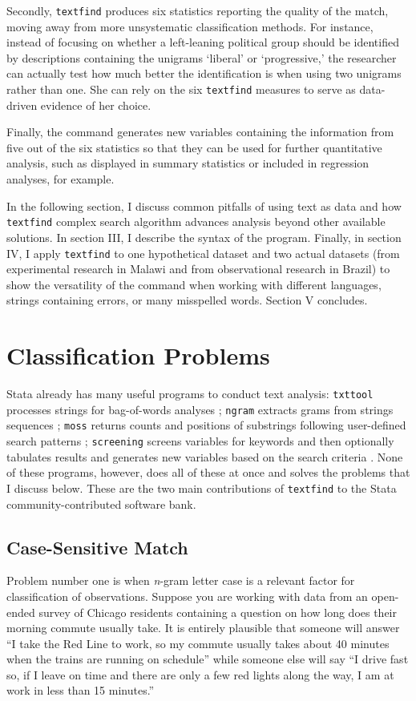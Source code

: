 Secondly, {\tt textfind} produces six statistics reporting the quality of the match, moving away from more unsystematic classification methods. For instance, instead of focusing on whether a left-leaning political group should be identified by descriptions containing the unigrams `liberal' or `progressive,' the researcher can actually test how much better the identification is when using two unigrams rather than one. She can rely on the six {\tt textfind} measures to serve as data-driven evidence of her choice.

Finally, the command generates new variables containing the information from five out of the six statistics so that they can be used for further quantitative analysis, such as displayed in summary statistics or included in regression analyses, for example.

In the following section, I discuss common pitfalls of using text as data and how {\tt textfind} complex search algorithm advances analysis beyond other available solutions. In section III, I describe the syntax of the program. Finally, in section IV, I apply {\tt textfind} to one hypothetical dataset and two actual datasets (from experimental research in Malawi and from observational research in Brazil) to show the versatility of the command when working with different languages, strings containing errors, or many misspelled words. Section V concludes.

\section[Problems]{Classification Problems} \label{sec:2}
Stata already has many useful programs to conduct text analysis: {\tt txttool} processes strings for bag-of-words analyses \citep{WilliamstxttoolUtilitiestext2014}; {\tt ngram} extracts grams from strings sequences \citep{SchonlauTextminingngram2017}; {\tt moss} returns counts and positions of substrings following user-defined search patterns \citep{CoxStatatip982011}; {\tt screening} screens variables for keywords and then optionally tabulates results and generates new variables based on the search criteria \citep{BelottiTranslationnarrativetext2010}. None of these programs, however, does all of these at once and solves the problems that I discuss below. These are the two main contributions of {\tt textfind} to the Stata community-contributed software bank.

\subsection[Case Sensitiveness]{Case-Sensitive Match} \label{subsec:2.1}
Problem number one is when {\it n}-gram letter case is a relevant factor for classification of observations. Suppose you are working with data from an open-ended survey of Chicago residents containing a question on how long does their morning commute usually take. It is entirely plausible that someone will answer ``I take the Red Line to work, so my commute usually takes about 40 minutes when the trains are running on schedule'' while someone else will say ``I drive fast so, if I leave on time and there are only a few red lights along the way, I am at work in less than 15 minutes.''

